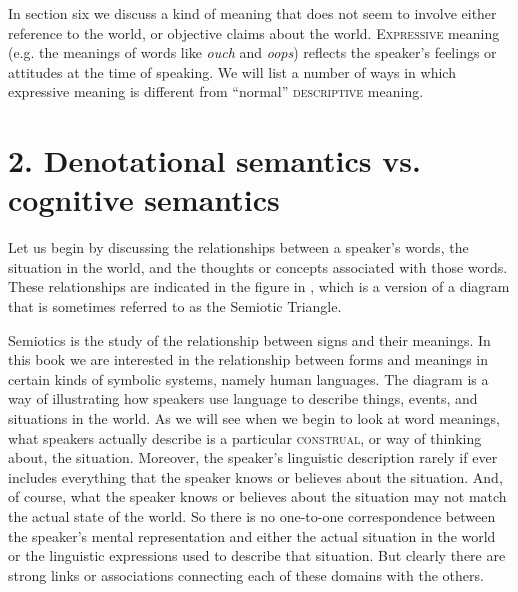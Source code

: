In section six we discuss a kind of meaning that does not seem to involve either reference to the world, or objective claims about the world. \textsc{Expressive} meaning (e.g. the meanings of words like \textit{ouch} and \textit{oops}) reflects the speaker’s feelings or attitudes at the time of speaking. We will list a number of ways in which expressive meaning is different from “normal” \textsc{descriptive} meaning.


\section{2. Denotational semantics vs. cognitive semantics}\label{sec:}

Let us begin by discussing the relationships between a speaker’s words, the situation in the world, and the thoughts or concepts associated with those words. These relationships are indicated in the figure in , which is a version of a diagram that is sometimes referred to as the Semiotic Triangle.





\ea \label{ex:2.2}
\z


Semiotics is the study of the relationship between signs and their meanings. In this book we are interested in the relationship between forms and meanings in certain kinds of symbolic systems, namely human languages. The diagram is a way of illustrating how speakers use language to describe things, events, and situations in the world. As we will see when we begin to look at word meanings, what speakers actually describe is a particular \textsc{construal}, or way of thinking about, the situation. Moreover, the speaker’s linguistic description rarely if ever includes everything that the speaker knows or believes about the situation. And, of course, what the speaker knows or believes about the situation may not match the actual state of the world. So there is no one-to-one correspondence between the speaker’s mental representation and either the actual situation in the world or the linguistic expressions used to describe that situation. But clearly there are strong links or associations connecting each of these domains with the others.



